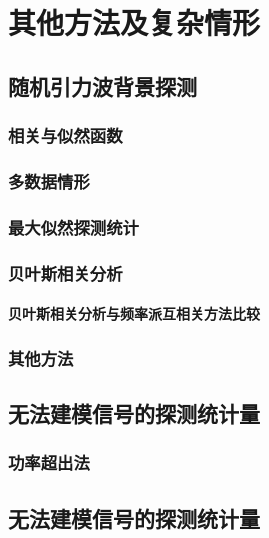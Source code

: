 
\chapter{其他方法及复杂情形}
\label{chap8}

\section{随机引力波背景探测}
\subsection{相关与似然函数}
\subsection{多数据情形}
\subsection{最大似然探测统计}
\subsection{贝叶斯相关分析}
\subsubsection{贝叶斯相关分析与频率派互相关方法比较}
\subsection{其他方法}

\section{无法建模信号的探测统计量}
\subsection{功率超出法}

\section{无法建模信号的探测统计量}
